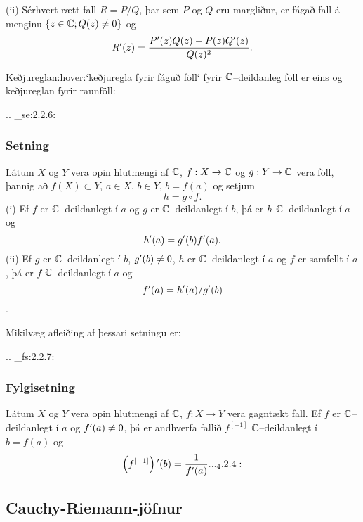 (ii) Sérhvert rætt fall $R=P/Q$, þar sem $P$ og $Q$ eru margliður, er
fágað fall á menginu $\{z\in {\mathbb C}; Q(z)\neq 0\}$
og
 $$R{\sp{\prime}}(z)= \dfrac{P{\sp{\prime}}(z)Q(z)-P(z)Q{\sp{\prime}}(z)}{Q(z)^2}.
 $$



Keðjureglan:hover:`keðjuregla fyrir fáguð föll` fyrir ${\mathbb C}$--deildanleg
föll er  eins og keðjureglan fyrir  raunföll:


.. _se:2.2.6:

\subsubsection{Setning}  Látum $X$ og $Y$ vera opin hlutmengi af ${\mathbb C}$, $f:X\to {\mathbb C}$ og
$g:Y\to {\mathbb C}$ vera föll, þannig að $f(X)\subset Y$, $a\in X$, $b\in Y$,
$b=f(a)$ og setjum
$$h=g\circ f.
$$ 
(i) Ef $f$ er ${\mathbb C}$--deildanlegt í $a$ og $g$ er ${\mathbb C}$--deildanlegt í
$b$, þá er $h$ ${\mathbb C}$--deildanlegt í $a$ og
 $$h{\sp{\prime}}(a)=g{\sp{\prime}}(b)f{\sp{\prime}}(a).
 $$
(ii) Ef $g$ er ${\mathbb C}$--deildanlegt í $b$, $g{\sp{\prime}}(b)\neq 0$, $h$ er
${\mathbb C}$--deildanlegt í $a$ og $f$ er samfellt í $a$, 
þá er $f$ ${\mathbb C}$--deildanlegt í $a$ og 
$$ f{\sp{\prime}}(a)=h{\sp{\prime}}(a)/g{\sp{\prime}}(b)$$.
 


Mikilvæg afleiðing af þessari setningu er:


.. _fs:2.2.7:

\subsubsection{Fylgisetning}  
Látum $X$ og $Y$ vera opin hlutmengi af ${\mathbb C}$, $f:X\to Y$ 
vera gagntækt fall.  Ef $f$ er ${\mathbb C}$--deildanlegt í $a$ og
$f{\sp{\prime}}(a)\neq 0$, þá er andhverfa fallið 
$f^{[-1]}$ ${\mathbb C}$--deildanlegt í $b=f(a)$ og
 \begin{equation*}\left(f^{[-1]}\right)\dash(b)= \dfrac 1{f\dash(a)}.

.. _4.2.4:

 \end{equation*}




\subsection*{Cauchy-Riemann-jöfnur}


